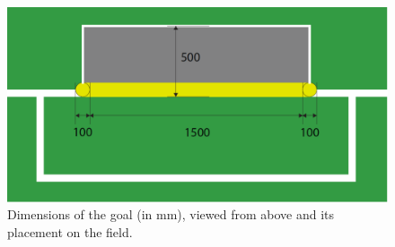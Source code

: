 \documentclass[12pt]{article}
\begin{document}
\begin{figure}[t!]
\begin{center}
\leavevmode
\includegraphics[width=1\columnwidth]{figs/goalDimensions.pdf}
\caption{Dimensions of the goal (in mm), viewed from above and its placement on the field.}
\label{fig:goal_dimensions}
\end{center}
\end{figure}
\end{document}
